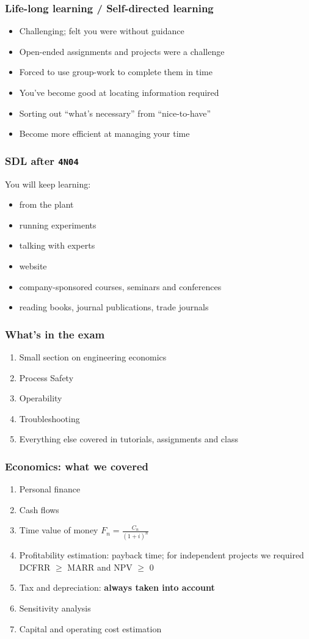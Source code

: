 \begin{frame}\frametitle{Life-long learning / Self-directed learning}
	\begin{itemize}
		\item	Challenging; felt you were without guidance
		\item	Open-ended assignments and projects were a challenge
		\item	Forced to use group-work to complete them in time
		\item	You've become good at locating information required
		\item	Sorting out ``what's necessary'' from ``nice-to-have''
		\item	Become more efficient at managing your time
	\end{itemize}
\end{frame}

\begin{frame}\frametitle{SDL after \texttt{4N04}}
	You will keep learning:
	\begin{itemize}
		\item	from the plant
		\item	running experiments
		\item	talking with experts
		\item	website
		\item	company-sponsored courses, seminars and conferences
		\item	reading books, journal publications, trade journals
	\end{itemize}
\end{frame}

\begin{frame}\frametitle{What's in the exam}
	\begin{enumerate}
		\item	Small section on engineering economics
		\item	Process Safety
		\item	Operability
		\item	Troubleshooting
		\item	Everything else covered in tutorials, assignments and class
	\end{enumerate}
\end{frame}

\begin{frame}\frametitle{Economics: what we covered}
	\begin{enumerate}
		\item	Personal finance
		\item	Cash flows
		\item	Time value of money $\displaystyle F_n = \frac{C_n}{(1+i)^n}$
		\item	Profitability estimation: payback time; for independent projects we required DCFRR $\geq$ MARR and NPV $\geq$ 0
		\item	Tax and depreciation: \textbf{always taken into account}
		\item	Sensitivity analysis
		\item	Capital and operating cost estimation
	\end{enumerate}
\end{frame}

